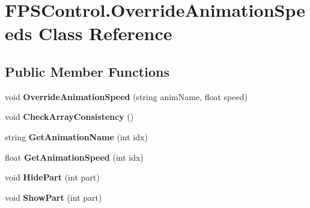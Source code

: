 \hypertarget{class_f_p_s_control_1_1_override_animation_speeds}{\section{F\-P\-S\-Control.\-Override\-Animation\-Speeds Class Reference}
\label{class_f_p_s_control_1_1_override_animation_speeds}
}
\subsection*{Public Member Functions}
\begin{DoxyCompactItemize}
\item 
\hypertarget{class_f_p_s_control_1_1_override_animation_speeds_a61ff1015d77a3c1c7b5721ef8a43c2e2}{void {\bfseries Override\-Animation\-Speed} (string anim\-Name, float speed)}\label{class_f_p_s_control_1_1_override_animation_speeds_a61ff1015d77a3c1c7b5721ef8a43c2e2}

\item 
\hypertarget{class_f_p_s_control_1_1_override_animation_speeds_af4af9c3b89fd26ed0e578c2c35e2785c}{void {\bfseries Check\-Array\-Consistency} ()}\label{class_f_p_s_control_1_1_override_animation_speeds_af4af9c3b89fd26ed0e578c2c35e2785c}

\item 
\hypertarget{class_f_p_s_control_1_1_override_animation_speeds_af9d3288cb488290e5c0fdd3c36677d42}{string {\bfseries Get\-Animation\-Name} (int idx)}\label{class_f_p_s_control_1_1_override_animation_speeds_af9d3288cb488290e5c0fdd3c36677d42}

\item 
\hypertarget{class_f_p_s_control_1_1_override_animation_speeds_a84dd02de456e5de0b4eb7380c55945f5}{float {\bfseries Get\-Animation\-Speed} (int idx)}\label{class_f_p_s_control_1_1_override_animation_speeds_a84dd02de456e5de0b4eb7380c55945f5}

\item 
\hypertarget{class_f_p_s_control_1_1_override_animation_speeds_adbc448c825e1ad9c117989885cb80e22}{void {\bfseries Hide\-Part} (int part)}\label{class_f_p_s_control_1_1_override_animation_speeds_adbc448c825e1ad9c117989885cb80e22}

\item 
\hypertarget{class_f_p_s_control_1_1_override_animation_speeds_a6ad648f17990958a2275239e4de75280}{void {\bfseries Show\-Part} (int part)}\label{class_f_p_s_control_1_1_override_animation_speeds_a6ad648f17990958a2275239e4de75280}

\end{DoxyCompactItemize}
